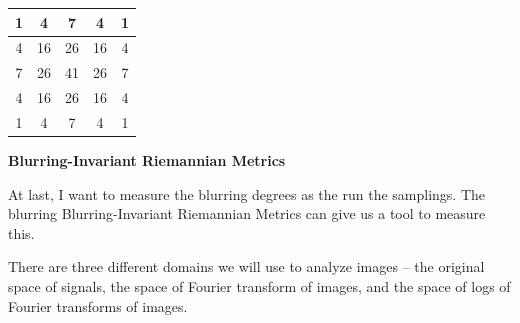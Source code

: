 \documentclass[11pt] {article}
\begin{document}
\begin{center}
\begin{tabular}{|c | c | c | c | c |} 
\hline
1 & 4 & 7 & 4 & 1 \\ 
\hline
4 & 16 & 26 & 16 & 4 \\
\hline
7 & 26 & 41 & 26 & 7 \\
\hline
4 & 16 & 26 & 16 & 4 \\
\hline
1 & 4 & 7 & 4 & 1 \\ 
\hline
\end{tabular}
\end{center}

\noindent \textbf{Blurring-Invariant Riemannian Metrics}

At last, I want to measure the blurring degrees as the run the samplings. The blurring Blurring-Invariant Riemannian Metrics can give us a tool to measure this. 

There are three different domains we will use to analyze images -- the original space of signals, the 
space of Fourier transform of images, and the space of logs of Fourier transforms of images.
\end{document}
